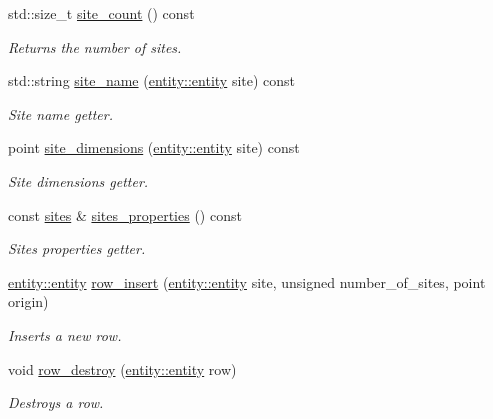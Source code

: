 \begin{DoxyCompactItemize}
std\-::size\-\_\-t \hyperlink{classophidian_1_1floorplan_1_1floorplan_a4c802b4b7d01d32124c08441a252a595}{site\-\_\-count} () const 
\begin{DoxyCompactList}\small\item\em Returns the number of sites. \end{DoxyCompactList}\item 
std\-::string \hyperlink{classophidian_1_1floorplan_1_1floorplan_a4fc7ee4e1596bb5a868bea820afb6d06}{site\-\_\-name} (\hyperlink{classophidian_1_1entity_1_1entity}{entity\-::entity} site) const 
\begin{DoxyCompactList}\small\item\em Site name getter. \end{DoxyCompactList}\item 
point \hyperlink{classophidian_1_1floorplan_1_1floorplan_a199f97cd289ec302d5a32b08852343b9}{site\-\_\-dimensions} (\hyperlink{classophidian_1_1entity_1_1entity}{entity\-::entity} site) const 
\begin{DoxyCompactList}\small\item\em Site dimensions getter. \end{DoxyCompactList}\item 
const \hyperlink{classophidian_1_1floorplan_1_1sites}{sites} \& \hyperlink{classophidian_1_1floorplan_1_1floorplan_a8cdc6ae613d2eb53eff766539bfa2d3d}{sites\-\_\-properties} () const 
\begin{DoxyCompactList}\small\item\em Sites properties getter. \end{DoxyCompactList}\item 
\hyperlink{classophidian_1_1entity_1_1entity}{entity\-::entity} \hyperlink{classophidian_1_1floorplan_1_1floorplan_a0e3e2e2e49b037387506f32736c46958}{row\-\_\-insert} (\hyperlink{classophidian_1_1entity_1_1entity}{entity\-::entity} site, unsigned number\-\_\-of\-\_\-sites, point origin)
\begin{DoxyCompactList}\small\item\em Inserts a new row. \end{DoxyCompactList}\item 
void \hyperlink{classophidian_1_1floorplan_1_1floorplan_a9f480d05677541d567260d67289eb6b3}{row\-\_\-destroy} (\hyperlink{classophidian_1_1entity_1_1entity}{entity\-::entity} row)
\begin{DoxyCompactList}\small\item\em Destroys a row. \end{DoxyCompactList}\item 

\end{DoxyCompactItemize}
